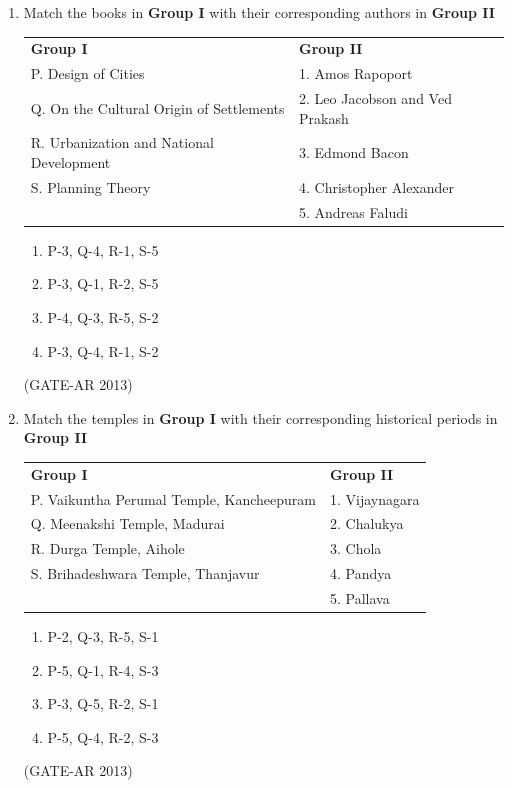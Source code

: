 \documentclass[a4paper,10pt]{article}
\begin{document}
\begin{enumerate}
    \item Match the books in \textbf{Group I} with their corresponding authors in \textbf{Group II} \\
    \begin{tabular}{ l l }
	\textbf{Group I} & \textbf{Group II} \\
	P. Design of Cities & 1. Amos Rapoport \\
	Q. On the Cultural Origin of Settlements & 2. Leo Jacobson and Ved Prakash \\
	R. Urbanization and National Development & 3. Edmond Bacon \\
	S. Planning Theory & 4. Christopher Alexander \\
	& 5. Andreas Faludi \\
	\end{tabular}
	\begin{multicols}{2}
	\begin{enumerate}
        \item P-3, Q-4, R-1, S-5
        \item P-3, Q-1, R-2, S-5
        \item P-4, Q-3, R-5, S-2
        \item P-3, Q-4, R-1, S-2
    \end{enumerate}
	\end{multicols}
    \hfill (GATE-AR 2013)

    \item Match the temples in \textbf{Group I} with their corresponding historical periods in \textbf{Group II} \\
    \begin{tabular}{ l l }
	\textbf{Group I} & \textbf{Group II} \\
	P. Vaikuntha Perumal Temple, Kancheepuram & 1. Vijaynagara \\
	Q. Meenakshi Temple, Madurai & 2. Chalukya \\
	R. Durga Temple, Aihole & 3. Chola \\
	S. Brihadeshwara Temple, Thanjavur & 4. Pandya \\
	& 5. Pallava \\
	\end{tabular}
	\begin{multicols}{2}
	\begin{enumerate}
        \item P-2, Q-3, R-5, S-1
        \item P-5, Q-1, R-4, S-3
        \item P-3, Q-5, R-2, S-1
        \item P-5, Q-4, R-2, S-3
    \end{enumerate}
	\end{multicols}
    \hfill (GATE-AR 2013)


\end{enumerate}
\end{document}
